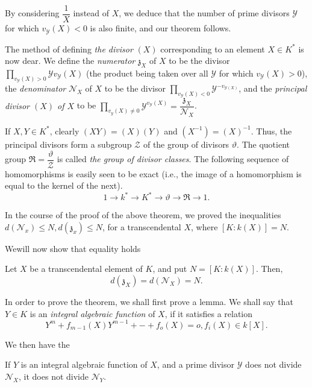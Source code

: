 By considering $\dfrac{1}{X}$ instead of $X$, we deduce that the
number of prime divisors $\mathscr{Y}$ for which $v_{\mathscr{Y}} (X)
< 0$ is also finite, and our theorem follows. 

The method of defining \textit{the divisor} $(X)$ corresponding to an
element $X \in K^*$ is now dear. We define the \textit{numerator}
$\mathfrak{z}_X$ of $X$ to be the divisor $\prod\limits_{v_\mathscr{Y}
  (X) > 0} \mathscr{Y} v_{\mathscr{Y}} (X)$ (the product being taken
over all $\mathscr{Y}$ for which $v_\mathscr{Y} (X) >0$), the
\textit{denominator} $\mathscr{N}_X$ of $X$ to be the divisor
$\prod\limits_{v_\mathscr{Y} (X) < 0} \mathscr{Y}^{-v_{\mathscr{Y} (X)}}$,
and the \textit{principal divisor $(X)$ of $X$} to be
$\prod\limits_{v_y (X) \neq 0} \mathscr{Y}^{v_\mathscr{Y} (X)}
=\dfrac{\mathfrak{z}_X}{\mathscr{N}_X}$. 

If $X, Y \in K^*$, clearly $(XY) = (X)(Y)$ and $(X^{-1}) =
(X)^{-1}$. Thus, the principal divisors form a subgroup $\mathscr{Z}$
of the group of divisors $\vartheta$. The quotient group $\mathfrak{R}
= \dfrac{\vartheta}{\mathscr{Z}}$ is called \textit{the group of
  divisor classes}. The following sequence of homomorphisms is easily
seen to be exact (i.e., the image of a homomorphism is equal to the
kernel of the next). 
$$
1 \to k^* \to K^* \to \vartheta \to \mathfrak{R} \to 1 .
$$

In the course of the proof of the above theorem, we proved the
inequalities $d(\mathscr{N}_x) \le N, d(\mathfrak{z}_x) \le N$, for a
transcendental $X$, where $[K : k(X)] = N$. 

We\pageoriginale will now show that equality holds
\begin{theorem*}%
  Let $X$ be a transcendental element of $K$, and put $N = [K :
    k(X)]$. Then, 
  $$
  d(\mathfrak{z}_X) = d(\mathscr{N}_X) = N .
  $$
\end{theorem*}

In order to prove the theorem, we shall first prove a lemma. We shall
say that $Y \in K$ is an \textit{integral algebraic function} of $X$,
if it satisfies a relation 
$$
Y^m + f_{m-1} (X)Y^{m-1} + - + f_o (X) = o, f_i(X) \in k[X] .
$$

We then have the 
\begin{lemma*}%
  If $Y$ is an integral algebraic function of $X$, and a prime
  divisor $\mathscr{Y}$ does not divide $\mathscr{N}_X$, it does not
  divide $\mathscr{N}_Y$. 
\end{lemma*}


